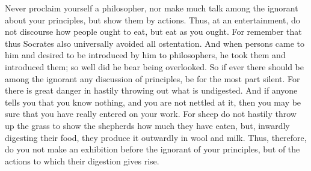Never proclaim yourself a philosopher, nor make much talk among the
ignorant about your principles, but show them by actions. Thus, at an
entertainment, do not discourse how people ought to eat, but eat as you
ought. For remember that thus Socrates also universally avoided all
ostentation. And when persons came to him and desired to be introduced by
him to philosophers, he took them and introduced them; so well did he
bear being overlooked. So if ever there should be among the ignorant any
discussion of principles, be for the most part silent. For there is great
danger in hastily throwing out what is undigested. And if anyone tells
you that you know nothing, and you are not nettled at it, then you may be
sure that you have really entered on your work. For sheep do not hastily
throw up the grass to show the shepherds how much they have eaten, but,
inwardly digesting their food, they produce it outwardly in wool and
milk. Thus, therefore, do you not make an exhibition before the ignorant
of your principles, but of the actions to which their digestion gives
rise.
